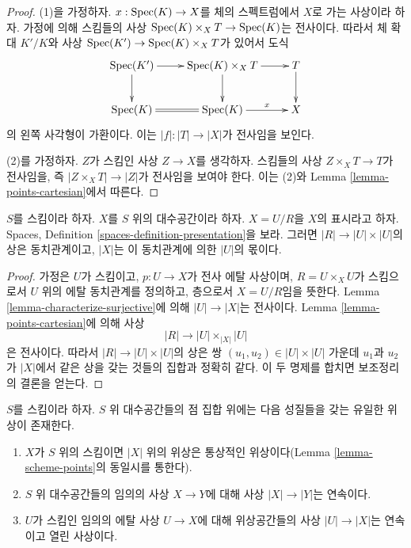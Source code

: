 \begin{proof}
(1)을 가정하자. $x : \mathop{\mathrm{Spec}}(K) \to X$를 체의 스펙트럼에서
$X$로 가는 사상이라 하자. 가정에 의해 스킴들의 사상
$\mathop{\mathrm{Spec}}(K) \times_X T \to \mathop{\mathrm{Spec}}(K)$는 전사이다.
따라서 체 확대 $K'/K$와 사상
$\mathop{\mathrm{Spec}}(K') \to \mathop{\mathrm{Spec}}(K) \times_X T$가 있어서 도식
$$
\xymatrix{
\Spec(K') \ar[r] \ar[d] &
\Spec(K) \times_X T \ar[d] \ar[r] &
T \ar[d] \\
\Spec(K) \ar@{=}[r] &
\Spec(K) \ar[r]^-x & X
}
$$
의 왼쪽 사각형이 가환이다. 이는
$|f| : |T| \to |X|$가 전사임을 보인다.

\medskip\noindent
(2)를 가정하자. $Z$가 스킴인 사상 $Z \to X$를 생각하자.
스킴들의 사상 $Z \times_X T \to T$가 전사임을,
즉 $|Z \times_X T| \to |Z|$가 전사임을 보여야 한다.
이는 (2)와 Lemma \ref{lemma-points-cartesian}에서 따른다.
\end{proof}

\begin{lemma}
\label{lemma-points-presentation}
$S$를 스킴이라 하자.
$X$를 $S$ 위의 대수공간이라 하자.
$X = U/R$을 $X$의 표시라고 하자. Spaces, Definition
\ref{spaces-definition-presentation}을 보라.
그러면 $|R| \to |U| \times |U|$의 상은 동치관계이고,
$|X|$는 이 동치관계에 의한 $|U|$의 몫이다.
\end{lemma}

\begin{proof}
가정은 $U$가 스킴이고, $p : U \to X$가 전사 에탈 사상이며,
$R = U \times_X U$가 스킴으로서 $U$ 위의 에탈 동치관계를
정의하고, 층으로서 $X = U/R$임을 뜻한다.
Lemma \ref{lemma-characterize-surjective}에 의해
$|U| \to |X|$는 전사이다.
Lemma \ref{lemma-points-cartesian}에 의해 사상
$$
|R| \longrightarrow |U| \times_{|X|} |U|
$$
은 전사이다. 따라서 $|R| \to |U| \times |U|$의 상은 쌍
$(u_1, u_2) \in |U| \times |U|$ 가운데 $u_1$과 $u_2$가
$|X|$에서 같은 상을 갖는 것들의 집합과 정확히 같다.
이 두 명제를 합치면 보조정리의 결론을 얻는다.
\end{proof}

\begin{lemma}
\label{lemma-topology-points}
$S$를 스킴이라 하자. $S$ 위 대수공간들의 점 집합 위에는
다음 성질들을 갖는 유일한 위상이 존재한다.
\begin{enumerate}
\item $X$가 $S$ 위의 스킴이면 $|X|$ 위의 위상은 통상적인
위상이다(Lemma \ref{lemma-scheme-points}의 동일시를 통한다).
\item $S$ 위 대수공간들의 임의의 사상 $X \to Y$에 대해
사상 $|X| \to |Y|$는 연속이다.
\item $U$가 스킴인 임의의 에탈 사상 $U \to X$에 대해
위상공간들의 사상 $|U| \to |X|$는 연속이고 열린 사상이다.
\end{enumerate}
\end{lemma}

